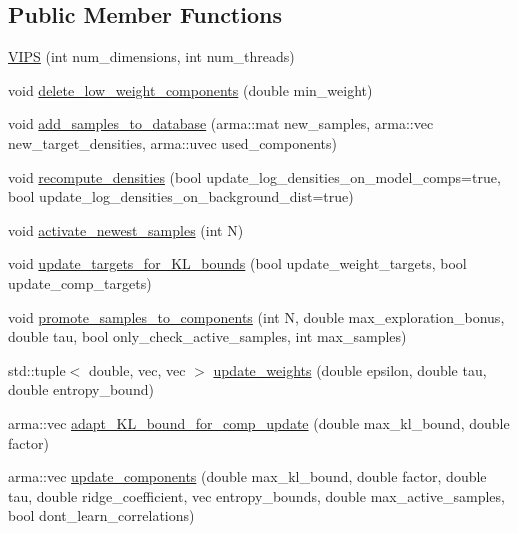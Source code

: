 \subsection*{Public Member Functions}
\begin{DoxyCompactItemize}
\item 
\hyperlink{classVIPS_a468c5d01f08c35ca0243f02fe6cafeaf}{V\+I\+PS} (int num\+\_\+dimensions, int num\+\_\+threads)
\item 
void \hyperlink{classVIPS_aba18c184ad6826ac8458fb573af7bcbc}{delete\+\_\+low\+\_\+weight\+\_\+components} (double min\+\_\+weight)
\item 
void \hyperlink{classVIPS_adff46a3464207e55c4e699e6d869d40f}{add\+\_\+samples\+\_\+to\+\_\+database} (arma\+::mat new\+\_\+samples, arma\+::vec new\+\_\+target\+\_\+densities, arma\+::uvec used\+\_\+components)
\item 
void \hyperlink{classVIPS_a8e90dcdcf50ffca10fbb9dbfd8176e22}{recompute\+\_\+densities} (bool update\+\_\+log\+\_\+densities\+\_\+on\+\_\+model\+\_\+comps=true, bool update\+\_\+log\+\_\+densities\+\_\+on\+\_\+background\+\_\+dist=true)
\item 
void \hyperlink{classVIPS_a2f862569f67b4061bbcd267108adede9}{activate\+\_\+newest\+\_\+samples} (int N)
\item 
void \hyperlink{classVIPS_a6e88b8a4ffd410ee100455458b5d9e3b}{update\+\_\+targets\+\_\+for\+\_\+\+K\+L\+\_\+bounds} (bool update\+\_\+weight\+\_\+targets, bool update\+\_\+comp\+\_\+targets)
\item 
void \hyperlink{classVIPS_afda46fdd2494774ae418a9fcccda905f}{promote\+\_\+samples\+\_\+to\+\_\+components} (int N, double max\+\_\+exploration\+\_\+bonus, double tau, bool only\+\_\+check\+\_\+active\+\_\+samples, int max\+\_\+samples)
\item 
std\+::tuple$<$ double, vec, vec $>$ \hyperlink{classVIPS_aebb5f603c3ec270f625eb2bd4d3efe3a}{update\+\_\+weights} (double epsilon, double tau, double entropy\+\_\+bound)
\item 
arma\+::vec \hyperlink{classVIPS_aac85e9be0da81e9fa603528aa7958a0a}{adapt\+\_\+\+K\+L\+\_\+bound\+\_\+for\+\_\+comp\+\_\+update} (double max\+\_\+kl\+\_\+bound, double factor)
\item 
arma\+::vec \hyperlink{classVIPS_a84a2917e689f48562e0f951a8f577723}{update\+\_\+components} (double max\+\_\+kl\+\_\+bound, double factor, double tau, double ridge\+\_\+coefficient, vec entropy\+\_\+bounds, double max\+\_\+active\+\_\+samples, bool dont\+\_\+learn\+\_\+correlations)
\item 

\end{DoxyCompactItemize}
